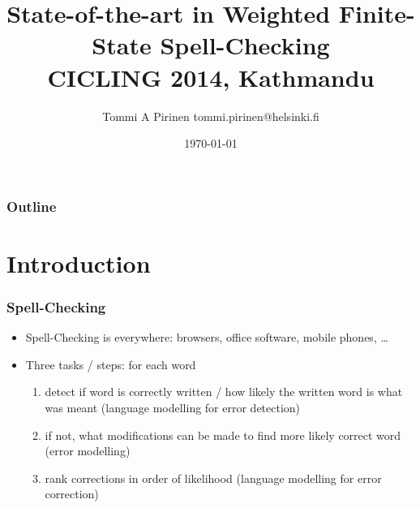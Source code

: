 \documentclass[t,12pt]{beamer}
\title{State-of-the-art in Weighted Finite-State Spell-Checking\\
\scriptsize{CICLING 2014, Kathmandu}}
\author{Tommi A Pirinen \scriptsize \guilsinglleft{}tommi.pirinen@helsinki.fi\guilsinglright{}}
\institute{University of Helsinki\\Department of Modern Languages}
\date{\today}
\begin{document}

\HyTitle

\begin{frame}
    \frametitle{Outline}
    \tableofcontents
\end{frame}



\section{Introduction}
       
\begin{frame}
    \frametitle{Spell-Checking}
    \begin{itemize}
        \item Spell-Checking is everywhere: browsers, office software, mobile
            phones, \ldots
        \item Three tasks / steps: for each word \begin{enumerate}
                \item detect if word is correctly written / how likely the
                    written word is what was meant (language modelling
                    for error detection)
                \item if not, what modifications can be made to find more
                    likely correct word (error modelling)
                \item rank corrections in order of likelihood
                    (language modelling for error correction)
            \end{enumerate}
    \end{itemize}
\end{frame}
\end{document}

